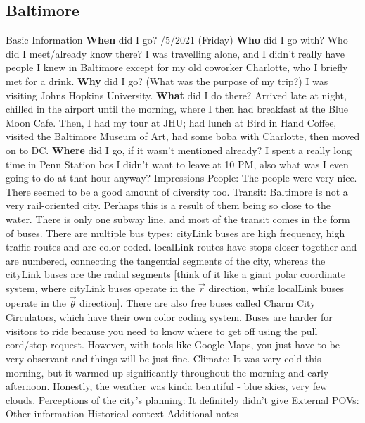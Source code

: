 \documentclass{article}
\begin{document}
    \subsection{Baltimore}
    \begin{outline}
        \1 Basic Information
            \2 \textbf{When} did I go?
                /5/2021 (Friday)
            \2 \textbf{Who} did I go with? Who did I meet/already know there?
                \3 I was travelling alone, and I didn't really have people I knew in Baltimore except for my old coworker Charlotte, who I briefly met for a drink. 
            \2 \textbf{Why} did I go? (What was the purpose of my trip?)
                \3 I was visiting Johns Hopkins University. 
            \2 \textbf{What} did I do there?
                \3 Arrived late at night, chilled in the airport until the morning, where I then had breakfast at the Blue Moon Cafe. Then, I had my tour at JHU; had lunch at Bird in Hand Coffee, visited the Baltimore Museum of Art, had some boba with Charlotte, then moved on to DC. 
            \2 \textbf{Where} did I go, if it wasn't mentioned already?
                \3 I spent a really long time in Penn Station bcs I didn't want to leave at 10 PM, also what was I even going to do at that hour anyway?
        \1 Impressions
            \2 People: The people were very nice. There seemed to be a good amount of diversity too. 
            \2 Transit: Baltimore is not a very rail-oriented city. Perhaps this is a result of them being so close to the water. There is only one subway line, and most of the transit comes in the form of buses. There are multiple bus types: cityLink buses are high frequency, high traffic routes and are color coded. localLink routes have stops closer together and are numbered, connecting the tangential segments of the city, whereas the cityLink buses are the radial segments [think of it like a giant polar coordinate system, where cityLink buses operate in the $\vec r$ direction, while localLink buses operate in the $\vec \theta$ direction]. There are also free buses called Charm City Circulators, which have their own color coding system. Buses are harder for visitors to ride because you need to know where to get off using the pull cord/stop request. However, with tools like Google Maps, you just have to be very observant and things will be just fine. 
            \2 Climate: It was very cold this morning, but it warmed up significantly throughout the morning and early afternoon. Honestly, the weather was kinda beautiful - blue skies, very few clouds. 
            \2 Perceptions of the city's planning: It definitely didn't give 
            \2 External POVs:
        \1 Other information 
            \2 Historical context
            \2 Additional notes 
    \end{outline}
\end{document}
